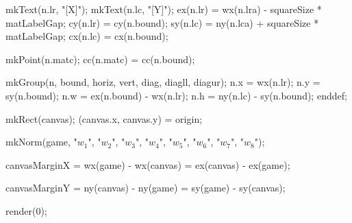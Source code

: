   mkText(n.lr, "[X]");
  mkText(n.lc, "[Y]");
  ex(n.lr) = wx(n.lra) - squareSize * matLabelGap;
  cy(n.lr) = cy(n.bound);
  sy(n.lc) = ny(n.lca) + squareSize * matLabelGap;
  cx(n.lc) = cx(n.bound);

  mkPoint(n.matc);
  cc(n.matc) = cc(n.bound);

  mkGroup(n, bound, horiz, vert, diag, diagll, diagur);
  n.x = wx(n.lr);
  n.y = sy(n.bound);
  n.w = ex(n.bound) - wx(n.lr);
  n.h = ny(n.lc) - sy(n.bound);
enddef;


mkRect(canvas);
(canvas.x, canvas.y) = origin;

mkNorm(game, "$w_1$", "$w_2$", "$w_3$", "$w_4$", "$w_5$", "$w_6$", "$w_7$", "$w_8$");

canvasMarginX =
wx(game) - wx(canvas) =
ex(canvas) - ex(game);

canvasMarginY =
ny(canvas) - ny(game) =
sy(game) - sy(canvas);

\stopMPinitializations

\startMPpage
  render(0);
\stopMPpage

